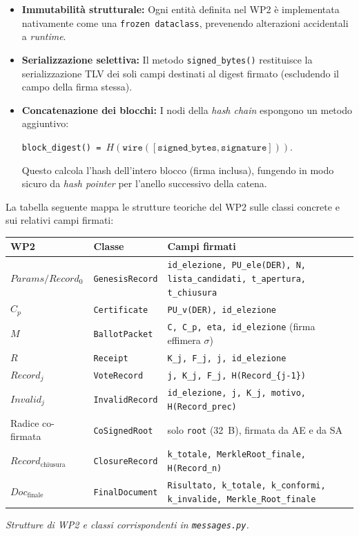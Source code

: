 \begin{itemize}
  \item \textbf{Immutabilità strutturale:} Ogni entità definita nel WP2 è implementata nativamente come una \texttt{frozen dataclass}, prevenendo alterazioni accidentali a \emph{runtime}.
  \item \textbf{Serializzazione selettiva:} Il metodo \texttt{signed\_bytes()} restituisce la serializzazione TLV dei soli campi destinati al digest firmato (escludendo il campo della firma stessa).
  \item \textbf{Concatenazione dei blocchi:} I nodi della \emph{hash chain} espongono un metodo aggiuntivo:
  
  \vspace{0.1em}
  
  \texttt{block\_digest()~=~$H(\texttt{wire}([\texttt{signed\_bytes}, \texttt{signature}]))$}. 
  
  \vspace{0.1em}
  Questo calcola l'hash dell'intero blocco (firma inclusa), fungendo in modo sicuro da \emph{hash pointer} per l'anello successivo della catena.
\end{itemize}

\noindent
La tabella seguente mappa le strutture teoriche del WP2 sulle classi concrete e sui relativi campi firmati:

\begin{center}
\small
\begin{tabular}{|l|l|p{6.6cm}|}
\hline
\textbf{WP2} & \textbf{Classe} & \textbf{Campi firmati} \\
\hline
$\mathit{Params}/\mathit{Record}_0$ & \texttt{GenesisRecord} &
  \texttt{id\_elezione, PU\_ele(DER), N, lista\_candidati, t\_apertura, t\_chiusura} \\
\hline
$C_p$ & \texttt{Certificate} & \texttt{PU\_v(DER), id\_elezione} \\
\hline
$M$ & \texttt{BallotPacket} & \texttt{C, C\_p, eta, id\_elezione} (firma effimera $\sigma$) \\
\hline
$R$ & \texttt{Receipt} & \texttt{K\_j, F\_j, j, id\_elezione} \\
\hline
$\mathit{Record}_j$ & \texttt{VoteRecord} & \texttt{j, K\_j, F\_j, H(Record\_\{j-1\})} \\
\hline
$\mathit{Invalid}_j$ & \texttt{InvalidRecord} &
  \texttt{id\_elezione, j, K\_j, motivo, H(Record\_prec)} \\
\hline
Radice co-firmata & \texttt{CoSignedRoot} & solo \texttt{root} (32~B), firmata da AE e da SA \\
\hline
$\mathit{Record}_{\text{chiusura}}$ & \texttt{ClosureRecord} &
  \texttt{k\_totale, MerkleRoot\_finale, H(Record\_n)} \\
\hline
$\mathit{Doc}_{\text{finale}}$ & \texttt{FinalDocument} &
  \texttt{Risultato, k\_totale, k\_conformi, k\_invalide, Merkle\_Root\_finale} \\
\hline
\end{tabular}
\end{center}
\begin{center}\small\itshape Strutture di WP2 e classi corrispondenti in \texttt{messages.py}.\end{center}


